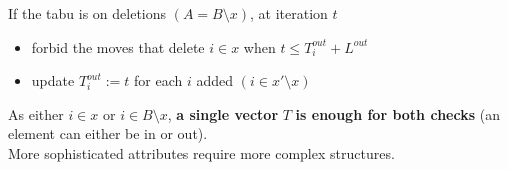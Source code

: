 If the tabu is on deletions $(A = B \setminus x)$, at iteration $t$
\begin{itemize}
	\item forbid the moves that delete $i \in x$ when $t \leq T_i^{out} + L^{out}$
	
	\item update $T_i^{out} := t$ for each $i$ added $(i \in x' \setminus x)$
\end{itemize}

As either $i \in x$ or $i \in B \setminus x$, \textbf{a single vector} $T$ \textbf{is enough for both checks} (an element can either be in or out).\\

More sophisticated attributes require more complex structures.\\

\newpage

